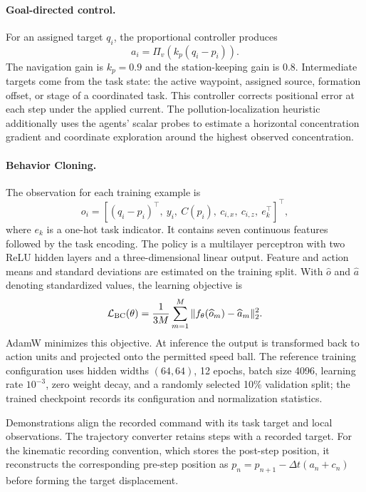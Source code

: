 \paragraph{Goal-directed control.}
For an assigned target $q_i$, the proportional controller produces
\begin{equation}
a_i=\Pi_v\!\left(k_p(q_i-p_i)\right).
\end{equation}
The navigation gain is $k_p=0.9$ and the station-keeping gain is $0.8$. Intermediate targets come from the task state: the active waypoint, assigned source, formation offset, or stage of a coordinated task. This controller corrects positional error at each step under the applied current. The pollution-localization heuristic additionally uses the agents' scalar probes to estimate a horizontal concentration gradient and coordinate exploration around the highest observed concentration.

\paragraph{Behavior Cloning.}
The observation for each training example is
\begin{equation}
o_i=[(q_i-p_i)^\top,\ y_i,\ C(p_i),\ c_{i,x},\ c_{i,z},\ e_k^\top]^\top,
\end{equation}
where $e_k$ is a one-hot task indicator. It contains seven continuous features followed by the task encoding. The policy is a multilayer perceptron with two ReLU hidden layers and a three-dimensional linear output. Feature and action means and standard deviations are estimated on the training split. With $\widehat o$ and $\widehat a$ denoting standardized values, the learning objective is
\begin{equation}
\mathcal L_{\rm BC}(\theta)=\frac{1}{3M}\sum_{m=1}^{M}
            \|f_\theta(\widehat o_m)-\widehat a_m\|_2^2.
\end{equation}
AdamW minimizes this objective. At inference the output is transformed back to action units and projected onto the permitted speed ball. The reference training configuration uses hidden widths $(64,64)$, 12 epochs, batch size 4096, learning rate $10^{-3}$, zero weight decay, and a randomly selected 10\% validation split; the trained checkpoint records its configuration and normalization statistics.

Demonstrations align the recorded command with its task target and local observations. The trajectory converter retains steps with a recorded target. For the kinematic recording convention, which stores the post-step position, it reconstructs the corresponding pre-step position as $p_n=p_{n+1}-\Delta t(a_n+c_n)$ before forming the target displacement.

